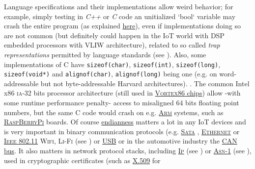 Language specifications and their implementations allow weird
behavior; for example, simply testing in \emph{C++} or \emph{C} code
an unitialized `bool` variable may crash the entire program (as
explained \href{https://stackoverflow.com/a/54125820/841108}{here}),
even if implementations doing so are not common (but definitely could
happen in the IoT world with DSP embedded processors with VLIW
architecture), related to so called \emph{trap representations}
permitted by language standards (see \cite{CplusPlus11:std,
  C11:std}). Also, some implementations of C have
\texttt{sizeof(char)}, \texttt{sizeof(int)}, \texttt{sizeof(long)},
\texttt{sizeof(void*)} and \texttt{alignof(char)},
\texttt{alignof(long)} being one (e.g. on word-addressable but not
byte-addressable Harvard architectures).  . The common
Intel x86 \textsc{ia-32} bits processor architecture (still used in
\href{https://en.wikipedia.org/wiki/Vortex86}{\textsc{Vortex86}
  chips}) allow -with some runtime performance penalty- access to
misaligned 64 bits floating point numbers, but the same C code would
crash on e.g. 
\href{https://en.wikipedia.org/wiki/ARM_architecture}{\textsc{Arm}}
systems, such as 
\href{https://raspberrypi.org/}{\textsc{RaspBerryPi}} boards. Of
course 
\href{https://en.wikipedia.org/wiki/Endianness}{endianness} matters a
lot in any IoT devices and is very important in binary communication
protocols
(e.g. \href{https://en.wikipedia.org/wiki/Serial_ATA}{\textsc{Sata}}
,
\href{https://en.wikipedia.org/wiki/Ethernet}{\textsc{Ethernet}}
 or
\href{https://en.wikipedia.org/wiki/IEEE_802.11}{\textsc{Ieee 802.11}}
 
\textsc{Wifi}, \textsc{Li-Fi} (see \cite{Khandal:2014:lifi})
 or  \href{https://en.wikipedia.org/wiki/USB}{USB} or in the
automotive industry the
\href{https://en.wikipedia.org/wiki/CAN_bus}{\textsc{CAN} bus}. It
also matters in network protocol stacks, including
\href{https://en.wikipedia.org/wiki/Internet_protocol_suite}{\textsc{Ip}}
(see \cite{Cerf:2005:protocol}) or 
\href{https://en.wikipedia.org/wiki/ASN.1}{\textsc{Asn-1}} (see
\cite{Barry:1992:ASN1}), used in cryptographic certificates (such as
\href{https://en.wikipedia.org/wiki/X.509}{X.509} for
